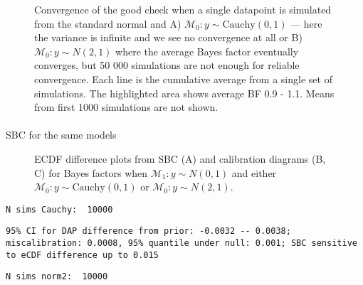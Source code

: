 \documentclass[
  letterpaper,
  DIV=11,
  numbers=noendperiod]{scrartcl}
\makeatletter
\let\oldparagraph\paragraph
\renewcommand{\paragraph}{
    \@ifstar
      \xxxParagraphStar
      \xxxParagraphNoStar
  }
\newcommand{\xxxParagraphStar}[1]{\oldparagraph*{#1}\mbox{}}
\newcommand{\xxxParagraphNoStar}[1]{\oldparagraph{#1}\mbox{}}
\makeatother
\begin{document}
\begin{figure}


\caption{\label{fig-good-convergence}Convergence of the good check when
a single datapoint is simulated from the standard normal and A)
\(\mathcal{M}_0: y \sim \text{Cauchy}(0, 1)\) --- here the variance is
infinite and we see no convergence at all or B)
\(\mathcal{M}_0: y \sim N(2, 1)\) where the average Bayes factor
eventually converges, but 50 000 simulations are not enough for reliable
convergence. Each line is the cumulative average from a single set of
simulations. The highlighted area shows average BF 0.9 - 1.1. Means from
first 1000 simulations are not shown.}

\end{figure}%

\paragraph{SBC for the same models}\label{sbc-for-the-same-models}

\begin{figure}


\caption{\label{fig-good-sbc}ECDF difference plots from SBC (A) and
calibration diagrams (B, C) for Bayes factors when
\(\mathcal{M}_1: y \sim N(0, 1)\) and either
\(\mathcal{M}_0: y \sim \text{Cauchy}(0, 1)\) or
\(\mathcal{M}_0: y \sim N(2, 1)\).}

\end{figure}%

\begin{verbatim}
N sims Cauchy:  10000 
\end{verbatim}

\begin{verbatim}
95% CI for DAP difference from prior: -0.0032 -- 0.0038; miscalibration: 0.0008, 95% quantile under null: 0.001; SBC sensitive to eCDF difference up to 0.015
\end{verbatim}

\begin{verbatim}
N sims norm2:  10000 
\end{verbatim}
\end{document}
